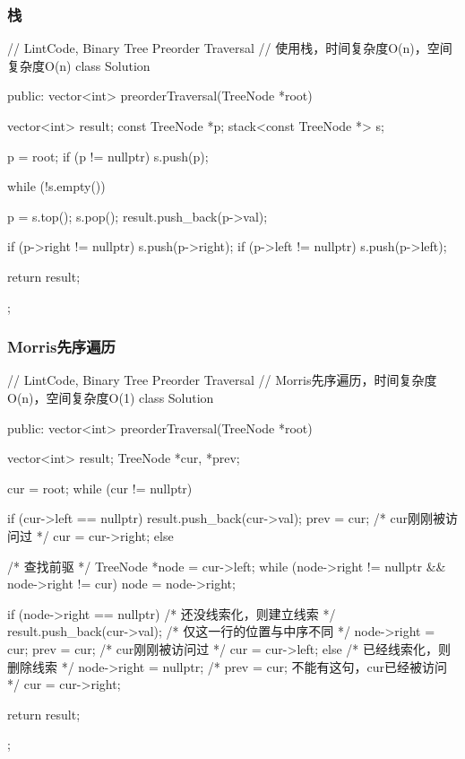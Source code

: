 \subsubsection{栈}
\begin{Code}
// LintCode, Binary Tree Preorder Traversal
// 使用栈，时间复杂度O(n)，空间复杂度O(n)
class Solution {
public:
    vector<int> preorderTraversal(TreeNode *root) {
        vector<int> result;
        const TreeNode *p;
        stack<const TreeNode *> s;

        p = root;
        if (p != nullptr) s.push(p);

        while (!s.empty()) {
            p = s.top();
            s.pop();
            result.push_back(p->val);

            if (p->right != nullptr) s.push(p->right);
            if (p->left != nullptr) s.push(p->left);
        }
        return result;
    }
};
\end{Code}


\subsubsection{Morris先序遍历}
\begin{Code}
// LintCode, Binary Tree Preorder Traversal
// Morris先序遍历，时间复杂度O(n)，空间复杂度O(1)
class Solution {
public:
    vector<int> preorderTraversal(TreeNode *root) {
        vector<int> result;
        TreeNode *cur, *prev;

        cur = root;
        while (cur != nullptr) {
            if (cur->left == nullptr) {
                result.push_back(cur->val);
                prev = cur; /* cur刚刚被访问过 */
                cur = cur->right;
            } else {
                /* 查找前驱 */
                TreeNode *node = cur->left;
                while (node->right != nullptr && node->right != cur)
                    node = node->right;

                if (node->right == nullptr) { /* 还没线索化，则建立线索 */
                    result.push_back(cur->val); /* 仅这一行的位置与中序不同 */
                    node->right = cur;
                    prev = cur; /* cur刚刚被访问过 */
                    cur = cur->left;
                } else {    /* 已经线索化，则删除线索  */
                    node->right = nullptr;
                    /* prev = cur; 不能有这句，cur已经被访问 */
                    cur = cur->right;
                }
            }
        }
        return result;
    }
};
\end{Code}


